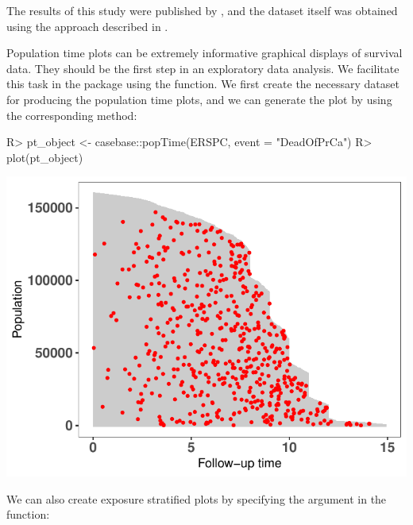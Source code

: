 \documentclass[
]{jss}
\begin{document}
The results of this study were published by
\citep{schroder2009screening}, and the dataset itself was obtained using
the approach described in \citep{liu2014recovering}.

Population time plots can be extremely informative graphical displays of
survival data. They should be the first step in an exploratory data
analysis. We facilitate this task in the  package using
the  function. We first create the necessary dataset for
producing the population time plots, and we can generate the plot by
using the corresponding  method:

\begin{CodeChunk}

\begin{CodeInput}
R> pt_object <- casebase::popTime(ERSPC, event = "DeadOfPrCa")
R> plot(pt_object)
\end{CodeInput}


\begin{center}\includegraphics{../figures/plot-erspc-data-1} \end{center}

\end{CodeChunk}

We can also create exposure stratified plots by specifying the
 argument in the  function:
\end{document}
